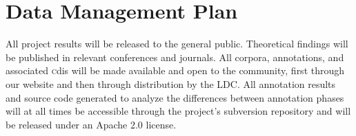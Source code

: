 \documentclass[11pt]{article}
\begin{document}
\section*{Data Management Plan}

All project results will be released to the general public. Theoretical findings will be published in relevant conferences and journals. All corpora, annotations, and associated {\textsc cdi}s will be made available and open to the community, first through our website and then through distribution by the LDC. All annotation results and  
source code generated to 
analyze the differences  between annotation phases  will at all times be accessible through the project's subversion repository and will be released under an Apache 2.0 license. 

\end{document}
